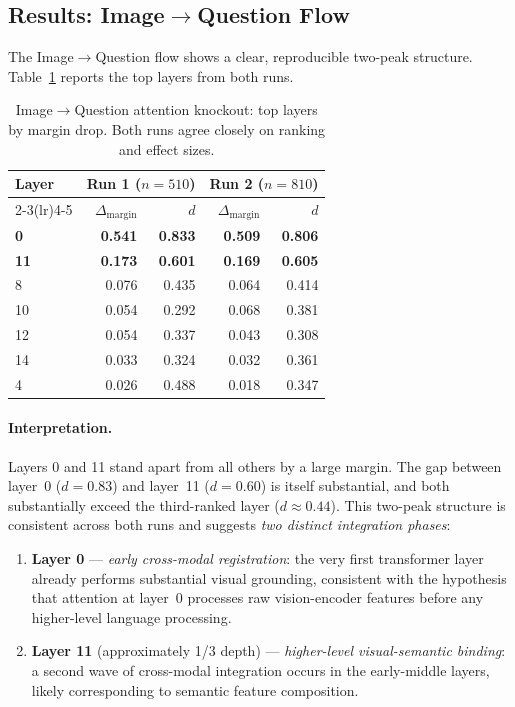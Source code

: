 \documentclass[11pt,a4paper]{article}
\begin{document}
\subsection{Results: Image$\to$Question Flow}

The Image$\to$Question flow shows a clear, reproducible two-peak structure.
Table~\ref{tab:knockout_iq} reports the top layers from both runs.

\begin{table}[ht]
\centering
\caption{Image$\to$Question attention knockout: top layers by margin drop.
  Both runs agree closely on ranking and effect sizes.}
\label{tab:knockout_iq}
\begin{tabular}{lrrrr}
\toprule
Layer & \multicolumn{2}{c}{Run 1 ($n=510$)} & \multicolumn{2}{c}{Run 2 ($n=810$)} \\
\cmidrule(lr){2-3}\cmidrule(lr){4-5}
      & $\Delta_{\mathrm{margin}}$ & $d$ & $\Delta_{\mathrm{margin}}$ & $d$ \\
\midrule
\textbf{0}  & \textbf{0.541} & \textbf{0.833} & \textbf{0.509} & \textbf{0.806} \\
\textbf{11} & \textbf{0.173} & \textbf{0.601} & \textbf{0.169} & \textbf{0.605} \\
8           & 0.076 & 0.435 & 0.064 & 0.414 \\
10          & 0.054 & 0.292 & 0.068 & 0.381 \\
12          & 0.054 & 0.337 & 0.043 & 0.308 \\
14          & 0.033 & 0.324 & 0.032 & 0.361 \\
4           & 0.026 & 0.488 & 0.018 & 0.347 \\
\bottomrule
\end{tabular}
\end{table}

\paragraph{Interpretation.}
Layers 0 and 11 stand apart from all others by a large margin. The gap between layer~0
($d = 0.83$) and layer~11 ($d = 0.60$) is itself substantial, and both substantially exceed the
third-ranked layer ($d \approx 0.44$). This two-peak structure is consistent across both runs
and suggests \emph{two distinct integration phases}:

\begin{enumerate}[noitemsep]
  \item \textbf{Layer 0} — \emph{early cross-modal registration}: the very first transformer layer
    already performs substantial visual grounding, consistent with the hypothesis that attention at
    layer~0 processes raw vision-encoder features before any higher-level language processing.
  \item \textbf{Layer 11} (approximately 1/3 depth) — \emph{higher-level visual-semantic binding}:
    a second wave of cross-modal integration occurs in the early-middle layers, likely corresponding
    to semantic feature composition.
\end{enumerate}
\end{document}
